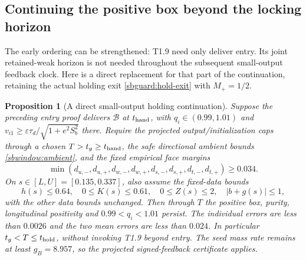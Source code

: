 \documentclass{article} %
\theoremstyle{plain}
\newtheorem{proposition}[theorem]{Proposition}
\theoremstyle{definition}
\theoremstyle{remark}
\begin{document}
\subsection{Continuing the positive box beyond the locking horizon}

The early ordering can be strengthened: T1.9 need only deliver entry.
Its joint retained-weak horizon is not needed throughout the subsequent
small-output feedback clock. Here is a direct replacement for that part
of the continuation, retaining the actual holding exit
\eqref{sbguard:hold-exit} with $M_+=1/2$.

\begin{proposition}[A direct small-output holding continuation]
\label{sbguard:direct-holding}
Suppose the preceding entry proof delivers $\mathcal B$ at
$t_{\rm hand}$, with $q_i\in(0.99,1.01)$ and
$v_{i1}\ge\varepsilon\tau_d/\sqrt{1+e^2S_b^2}$ there.
Require the projected output/initialization caps through a chosen
$T>t_g\ge t_{\rm hand}$, the safe directional ambient bounds
\eqref{sbwindow:ambient}, and the fixed empirical face margins
\[
 \min(d_{u,-},d_{u,+},d_{w,-},d_{w,+},
                  d_{s,-},d_{s,+},d_{t,-},d_{t,+})\ge0.034.
\]
On $s\in[L,U]=[0.135,0.337]$, also assume the fixed-data bounds
\[
 h(s)\le0.64,\quad 0\le K(s)\le0.61,\quad
 0\le Z(s)\le2,\quad |b+g(s)|\le1,
\]
with the other data bounds unchanged. Then through $T$ the positive
box, purity, longitudinal positivity and $0.99<q_i<1.01$ persist.
The individual errors are less than $0.0026$ and the two mean errors
are less than $0.024$. In particular $t_g<T\le t_{\rm hold}$,
without invoking T1.9 beyond entry. The seed mass rate remains at least
$g_B=8.957$, so the projected signed-feedback certificate applies.
\end{proposition}
\end{document}
